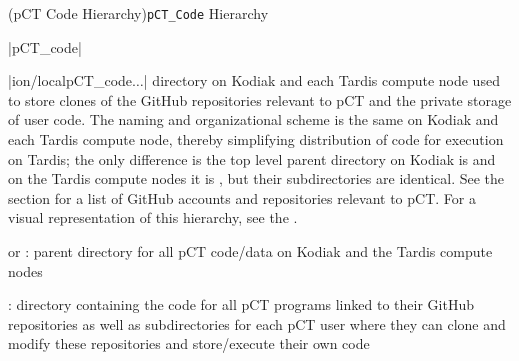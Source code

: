 \Subsection(pCT Code Hierarchy){\texttt{pCT\_Code} Hierarchy}
\begin{tcbenvironment}|pCT\_code|
\begin{tcbparbox}|\dirsep ion/local\dirsep pCT\_code\dirsep$\dots$|
\bfdash directory on Kodiak and each Tardis compute node used to store clones of the GitHub repositories relevant to pCT and the private storage of user code.  The naming and organizational scheme is the same on Kodiak and each Tardis compute node, thereby simplifying distribution of code for execution on Tardis; the only difference is the top level parent directory on Kodiak is  and on the Tardis compute nodes it is , but their subdirectories are identical.  See the  section for a list of GitHub accounts and repositories relevant to pCT.  For a visual representation of this hierarchy, see the .
\end{tcbparbox}
\begin{tcbenumbox}
\begin{ThinEnum}[labelindent=1pt, leftmargin=*]
    \item {} or  : parent directory for all pCT code/data on Kodiak and the Tardis compute nodes
        \begin{ThinEnum}[labelindent=1pt, leftmargin=*]
            \item {} : directory containing the code for all pCT programs linked to their GitHub repositories as well as subdirectories for each pCT user where they can clone and modify these repositories and store/execute their own code

\end{ThinEnum}
\end{ThinEnum}
\end{tcbenumbox}
\end{tcbenvironment}
